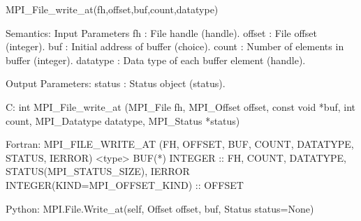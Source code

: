 MPI_File_write_at(fh,offset,buf,count,datatype)

Semantics:
Input Parameters
fh : File handle (handle).
offset : File offset (integer).
buf : Initial address of buffer (choice).
count : Number of elements in buffer (integer).
datatype : Data type of each buffer element (handle).

Output Parameters:
status : Status object (status).

C:
int MPI_File_write_at
   (MPI_File fh, MPI_Offset offset, const void *buf,
    int count, MPI_Datatype datatype, MPI_Status *status)

Fortran:
MPI_FILE_WRITE_AT
   (FH,  OFFSET,  BUF, COUNT, DATATYPE, STATUS,  IERROR)
<type>    BUF(*)
INTEGER :: FH, COUNT, DATATYPE, STATUS(MPI_STATUS_SIZE), IERROR
INTEGER(KIND=MPI_OFFSET_KIND) :: OFFSET

Python:
MPI.File.Write_at(self, Offset offset, buf, Status status=None)
